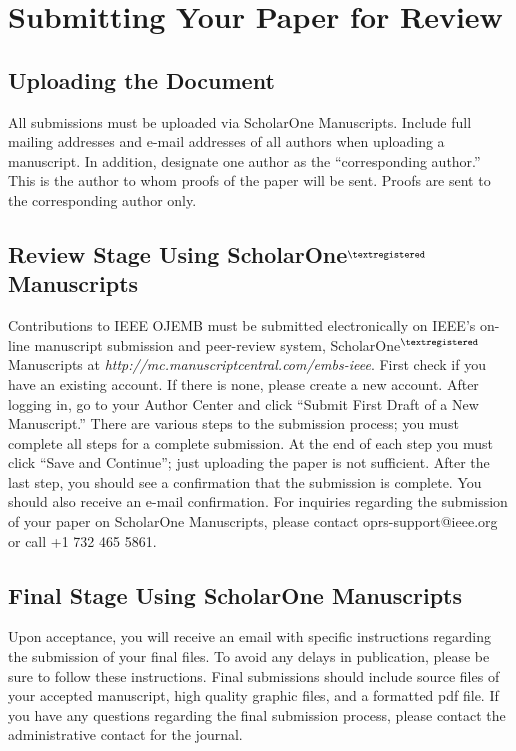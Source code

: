 \documentclass[journal]{IEEEtran}
\begin{document}


\section{Submitting Your Paper for Review}

{
\subsection{Uploading the Document}
All submissions must be uploaded via ScholarOne Manuscripts. Include full mailing addresses and e-mail addresses of all authors when uploading a manuscript. In addition, designate one author as the “corresponding author.” This is the author to whom proofs of the paper will be sent. Proofs are sent to the corresponding author only.

\subsection{Review Stage Using ScholarOne$^{\tiny\textregistered}$ Manuscripts}
Contributions to IEEE OJEMB must be submitted electronically on IEEE’s on-line manuscript submission and peer-review system, ScholarOne$^{\tiny\textregistered}$ Manuscripts at \textit{http://mc.manuscriptcentral.com/embs-ieee}. First check if you have an existing account. If there is none, please create a new account. After logging in, go to your Author Center and click “Submit First Draft of a New Manuscript.” 
There are various steps to the submission process; you must complete all steps for a complete submission. At the end of each step you must click “Save and Continue”; just uploading the paper is not sufficient. After the last step, you should see a confirmation that the submission is complete. You should also receive an e-mail confirmation. For inquiries regarding the submission of your paper on ScholarOne Manuscripts, please contact oprs-support@ieee.org or call +1 732 465 5861.

\subsection{Final Stage Using ScholarOne Manuscripts}
Upon acceptance, you will receive an email with specific instructions regarding the submission of your final files.  To avoid any delays in publication, please be sure to follow these instructions.  Final submissions should include source files of your accepted manuscript, high quality graphic files, and a formatted pdf file.  If you have any questions regarding the final submission process, please contact the administrative contact for the journal. 
}
\end{document}
